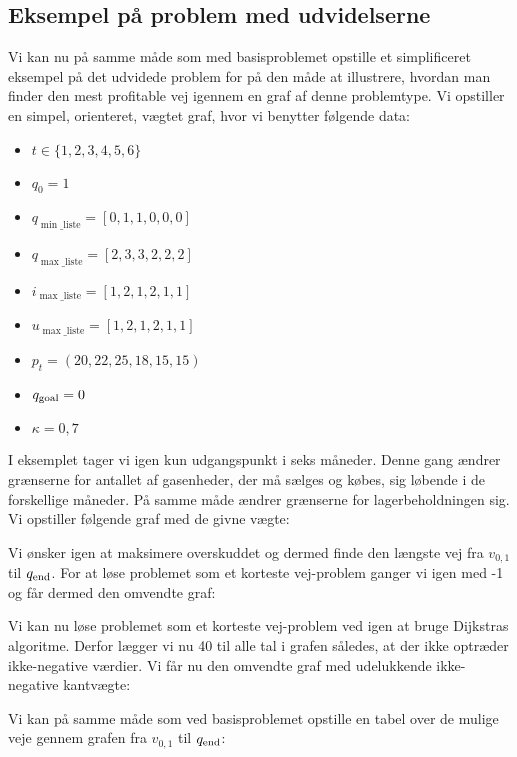 \subsection{Eksempel på problem med udvidelserne} \label{kap:grafen_for_udvidet}
Vi kan nu på samme måde som med basisproblemet opstille et simplificeret eksempel på det udvidede problem for på den måde at illustrere, hvordan man finder den mest profitable vej igennem en graf af denne problemtype. Vi opstiller en simpel, orienteret, vægtet graf, hvor vi benytter følgende data:

\begin{itemize}
  \item $t \in \{1,2,3,4,5,6\}$
  \item $q_{0}=1$
  \item $q_{\min \_ \textrm{liste}}=[0,1,1,0,0,0]$
  \item $q_{\max \_ \textrm{liste}}=[2,3,3,2,2,2]$
  \item $i_{\max \_ \textrm{liste}}=[1,2,1,2,1,1]$
  \item $u_{\max \_ \textrm{liste}}=[1,2,1,2,1,1]$
  \item $p_{t}=(20,22,25,18,15,15)$
  \item $q_{\textrm{goal}}=0$
  \item $\kappa=0,7$
\end{itemize}

I eksemplet tager vi igen kun udgangspunkt i seks måneder. Denne gang ændrer grænserne for antallet af gasenheder, der må sælges og købes, sig løbende i de forskellige måneder. På samme måde ændrer grænserne for lagerbeholdningen sig. Vi opstiller følgende graf med de givne vægte:



Vi ønsker igen at maksimere overskuddet og dermed finde den længste vej fra $v_{0,1}$ til $q_{\textrm{end}}$. For at løse problemet som et korteste vej-problem ganger vi igen med -1 og får dermed den omvendte graf:



Vi kan nu løse problemet som et korteste vej-problem ved igen at bruge Dijkstras algoritme. Derfor lægger vi nu 40 til alle tal i grafen således, at der ikke optræder ikke-negative værdier. Vi får nu den omvendte graf med udelukkende ikke-negative kantvægte:




Vi kan på samme måde som ved basisproblemet opstille en tabel over de mulige veje gennem grafen fra $v_{0,1}$ til $q_{\textrm{end}}$:

